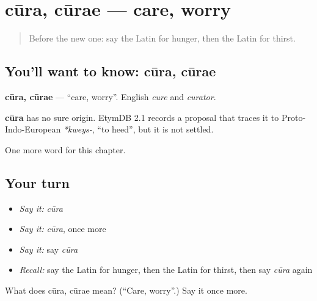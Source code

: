 \section[cūra, cūrae]{cūra, cūrae — care, worry}

\label{lesson:LA-C68-cura}



\begin{quote}
Before the new one: say the Latin for hunger, then the Latin for thirst.
\end{quote}

\subsection*{You'll want to know: cūra, cūrae}
\textbf{cūra, cūrae} — \textquotedblleft{}care, worry\textquotedblright{}. English \emph{cure} and \emph{curator}.

\begin{cousinweb}
\textbf{cūra} has no sure origin. EtymDB 2.1 records a proposal that traces it to Proto-Indo-European \emph{*kweys-}, \textquotedblleft{}to heed\textquotedblright{}, but it is not settled.
\end{cousinweb}

\begin{grammarlens}[title={What you've built}]
One more word for this chapter.
\end{grammarlens}

\subsection*{Your turn}
\begin{itemize}
\raggedright
  \item \emph{Say it:} \emph{cūra}
  \item \emph{Say it:} \emph{cūra}, once more
  \item \emph{Say it:} say \emph{cūra}
  \item \emph{Recall:} say the Latin for hunger, then the Latin for thirst, then say \emph{cūra} again
\end{itemize}

\begin{tcolorbox}[breakable,colback=teal!4,colframe=teal!35!black,title={Before you move on}]
What does cūra, cūrae mean? (\textquotedblleft{}Care, worry\textquotedblright{}.) Say it once more.
\end{tcolorbox}

